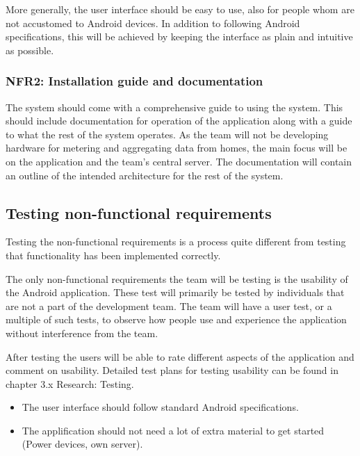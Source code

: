 More generally, the user interface should be easy to use, also for people whom are not accustomed to Android devices. In 
addition to following Android specifications, this will be achieved by keeping the interface as plain and intuitive as possible.

\subsubsection{NFR2: Installation guide and documentation}
The system should come with a comprehensive guide to using the system. This should include documentation for operation of the
application along with a guide to what the rest of the system operates. As the team will not be developing hardware for metering and 
aggregating data from homes, the main focus will be on the application and the team's central server. The documentation will contain an outline 
of the intended architecture for the rest of the system.

\subsection{Testing non-functional requirements}
Testing the non-functional requirements is a process quite different from testing that functionality has been implemented correctly.

The only non-functional requirements the team will be testing is the usability of the Android application. These test will primarily be 
tested by individuals that are not a part of the development team. The team will have a user test, or a multiple of such tests, to observe how people use and experience the application without interference from the team. 

After testing the users will be able to rate different aspects of the application and comment on usability. Detailed 
test plans for testing usability can be found in chapter 3.x Research: Testing.

\begin{itemize}
\item The user interface should follow standard Android specifications. 
\item The applification should not need a lot of extra material to get started (Power devices, own server).
\end{itemize}



